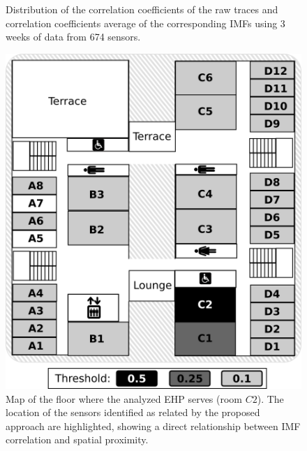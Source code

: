 \begin{figure}[tbh!]
\centering
 \caption{Distribution of the correlation coefficients of the raw traces and correlation coefficients average of the corresponding IMFs using 3 weeks of data from 674 sensors.}
\label{fig:histo}
\end{figure}

\begin{figure}
\centering
\includegraphics[width=.45\textwidth]{figs/floorMap.png}
\caption{Map of the floor where the analyzed EHP serves (room $C2$). The location of the sensors identified as related by the proposed approach are highlighted, showing a direct relationship between IMF correlation and spatial proximity.}
\label{fig:map}
\end{figure}

